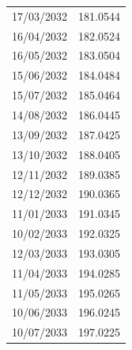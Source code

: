 \documentclass{apmcmthesis}
\begin{document}
\begin{longtable}{c c}
        17/03/2032 & 181.0544   \\
        16/04/2032 & 182.0524   \\
        16/05/2032 & 183.0504   \\
        15/06/2032 & 184.0484   \\
        15/07/2032 & 185.0464   \\
        14/08/2032 & 186.0445   \\
        13/09/2032 & 187.0425   \\
        13/10/2032 & 188.0405   \\
        12/11/2032 & 189.0385   \\
        12/12/2032 & 190.0365   \\
        11/01/2033 & 191.0345   \\
        10/02/2033 & 192.0325   \\
        12/03/2033 & 193.0305   \\
        11/04/2033 & 194.0285   \\
        11/05/2033 & 195.0265   \\
        10/06/2033 & 196.0245   \\
        10/07/2033 & 197.0225  \\

\end{longtable}
\end{document}

